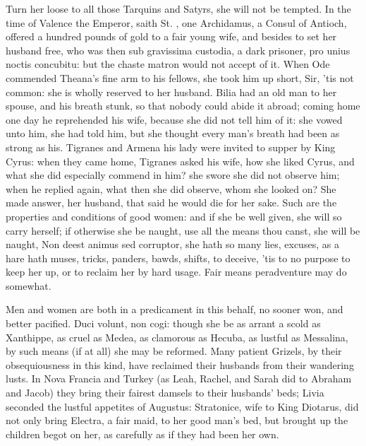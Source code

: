 Turn her loose to all those Tarquins and Satyrs, she will not be
tempted. In the time of Valence the Emperor, saith St. \Austin{},
one Archidamus, a Consul of Antioch, offered a hundred pounds of gold
to a fair young wife, and besides to set her husband free, who was then
sub gravissima custodia, a dark prisoner, pro unius noctis concubitu:
but the chaste matron would not accept of it. When Ode commended
Theana's fine arm to his fellows, she took him up short, Sir, 'tis not
common: she is wholly reserved to her husband. Bilia had an old
man to her spouse, and his breath stunk, so that nobody could abide it
abroad; coming home one day he reprehended his wife, because she did
not tell him of it: she vowed unto him, she had told him, but she
thought every man's breath had been as strong as his. Tigranes
and Armena his lady were invited to supper by King Cyrus: when they
came home, Tigranes asked his wife, how she liked Cyrus, and what she
did especially commend in him? she swore she did not observe him; when
he replied again, what then she did observe, whom she looked on? She
made answer, her husband, that said he would die for her sake. Such are
the properties and conditions of good women: and if she be well given,
she will so carry herself; if otherwise she be naught, use all the
means thou canst, she will be naught, Non deest animus sed corruptor,
she hath so many lies, excuses, as a hare hath muses, tricks, panders,
bawds, shifts, to deceive, 'tis to no purpose to keep her up, or to
reclaim her by hard usage. Fair means peradventure may do somewhat.

  Men and women are both in a
predicament in this behalf, no sooner won, and better pacified. Duci
volunt, non cogi: though she be as arrant a scold as Xanthippe, as
cruel as Medea, as clamorous as Hecuba, as lustful as Messalina, by
such means (if at all) she may be reformed. Many patient Grizels,
by their obsequiousness in this kind, have reclaimed their husbands
from their wandering lusts. In Nova Francia and Turkey (as Leah,
Rachel, and Sarah did to Abraham and Jacob) they bring their fairest
damsels to their husbands' beds; Livia seconded the lustful appetites
of Augustus: Stratonice, wife to King Diotarus, did not only bring
Electra, a fair maid, to her good man's bed, but brought up the
children begot on her, as carefully as if they had been her own.

